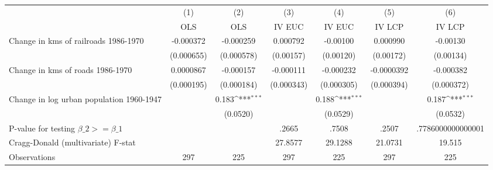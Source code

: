{
\def\sym#1{\ifmmode^{#1}\else\(^{#1}\)\fi}
\begin{tabular}{l*{6}{c}}
\hline\hline
                &\multicolumn{1}{c}{(1)}&\multicolumn{1}{c}{(2)}&\multicolumn{1}{c}{(3)}&\multicolumn{1}{c}{(4)}&\multicolumn{1}{c}{(5)}&\multicolumn{1}{c}{(6)}\\
                &\multicolumn{1}{c}{OLS}&\multicolumn{1}{c}{OLS}&\multicolumn{1}{c}{IV EUC}&\multicolumn{1}{c}{IV EUC}&\multicolumn{1}{c}{IV LCP}&\multicolumn{1}{c}{IV LCP}\\
\hline
Change in kms of railroads 1986-1970&-0.000372         &-0.000259         & 0.000792         & -0.00100         & 0.000990         & -0.00130         \\
                &(0.000655)         &(0.000578)         &(0.00157)         &(0.00120)         &(0.00172)         &(0.00134)         \\
[1em]
Change in kms of roads 1986-1970&0.0000867         &-0.000157         &-0.000111         &-0.000232         &-0.0000392         &-0.000382         \\
                &(0.000195)         &(0.000184)         &(0.000343)         &(0.000305)         &(0.000394)         &(0.000372)         \\
[1em]
Change in log urban population 1960-1947&                  &    0.183\sym{***}&                  &    0.188\sym{***}&                  &    0.187\sym{***}\\
                &                  & (0.0520)         &                  & (0.0529)         &                  & (0.0532)         \\
\hline
P-value for testing $\beta\_{2} >= \beta\_{1}$&                  &                  &    .2665         &    .7508         &    .2507         &.7786000000000001         \\
Cragg-Donald (multivariate) F-stat&                  &                  &  27.8577         &  29.1288         &  21.0731         &   19.515         \\
Observations    &      297         &      225         &      297         &      225         &      297         &      225         \\
\hline\hline
\end{tabular}
}
